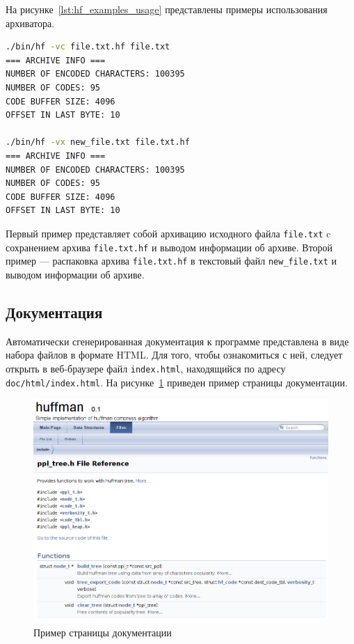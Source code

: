 На рисунке~\ref{lst:hf_examples_usage} представлены примеры использования
архиватора.

\begin{lstlisting}[basicstyle=\scriptsize\ttfamily,
                   numberstyle=\scriptsize\ttfamily,
                   xleftmargin=7mm,
                   language=bash,
                   caption=Примеры использования архиватора,
                   label=lst:hf_examples_usage]
./bin/hf -vc file.txt.hf file.txt 
=== ARCHIVE INFO ===
NUMBER OF ENCODED CHARACTERS: 100395
NUMBER OF CODES: 95
CODE BUFFER SIZE: 4096
OFFSET IN LAST BYTE: 10

./bin/hf -vx new_file.txt file.txt.hf
=== ARCHIVE INFO ===
NUMBER OF ENCODED CHARACTERS: 100395
NUMBER OF CODES: 95
CODE BUFFER SIZE: 4096
OFFSET IN LAST BYTE: 10
\end{lstlisting}

Первый пример представляет собой архивацию исходного файла \texttt{file.txt}
c сохранением архива \texttt{file.txt.hf} и выводом информации об архиве.
Второй пример --- распаковка архива \texttt{file.txt.hf}
в текстовый файл \texttt{new\_file.txt} и выводом информации об архиве.

\subsection{Документация}

Автоматически сгенерированная документация к программе представлена в виде набора
файлов в формате HTML. Для того, чтобы ознакомиться с ней,
следует открыть в веб-браузере файл \texttt{index.html},
находящийся по адресу \texttt{doc/html/index.html}.
На рисунке~\ref{pic:documentation} приведен пример страницы документации.

\begin{figure}[h!]
  \centering
  \includegraphics[width=150mm]{pic/documentation.png}
  \caption{Пример страницы документации}
  \label{pic:documentation}
\end{figure}
